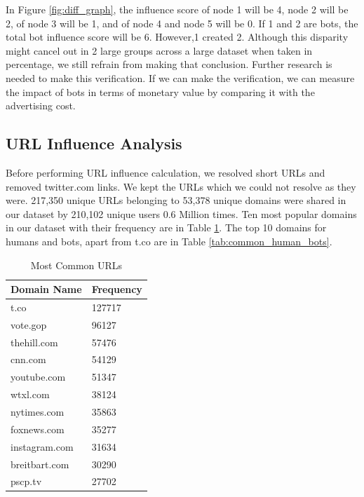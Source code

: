 \documentclass[letterpaper]{article}
\begin{document}
In Figure \ref{fig:diff_graph}, the influence score of node 1 will be 4, node 2 will be 2, of node 3 will be 1, and of node 4 and node 5 will be 0. If 1 and 2 are bots, 
the total bot influence score will be 6. However,1 created 
2. Although this disparity might cancel out in 2 large groups across a large dataset when taken in percentage, we still refrain from making that conclusion. 
Further research is needed to make 
this verification. If we can make the verification, we can measure the impact of bots in terms of monetary value by comparing it with the advertising cost.

\subsection{URL Influence Analysis}
Before performing URL influence calculation, we resolved short URLs and removed twitter.com links. We kept the URLs 
which we could not resolve as they were. 
217,350 unique URLs belonging to 53,378 unique domains were shared in our dataset by 210,102 unique users 0.6 Million
times. Ten most popular domains in our dataset with their frequency are
in Table \ref{tab:Common_urls}. The top 10 domains for humans and bots, apart from t.co are in Table 
\ref{tab:common_human_bots}.

\begin{table}[H]
    \centering
    \begin{tabular}{|l|l|}
    \hline
    \textbf{Domain Name} & \textbf{Frequency} \\ \hline
    t.co & 127717 \\ \hline
    vote.gop & 96127 \\ \hline
    thehill.com & 57476 \\ \hline
    cnn.com & 54129 \\ \hline
    youtube.com & 51347 \\ \hline
    wtxl.com & 38124 \\ \hline
    nytimes.com & 35863 \\ \hline
    foxnews.com & 35277 \\ \hline
    instagram.com & 31634 \\ \hline
    breitbart.com & 30290 \\ \hline
    pscp.tv & 27702 \\ \hline
    \end{tabular}
    \caption{Most Common URLs}
    \label{tab:Common_urls}
\end{table}
\end{document}
